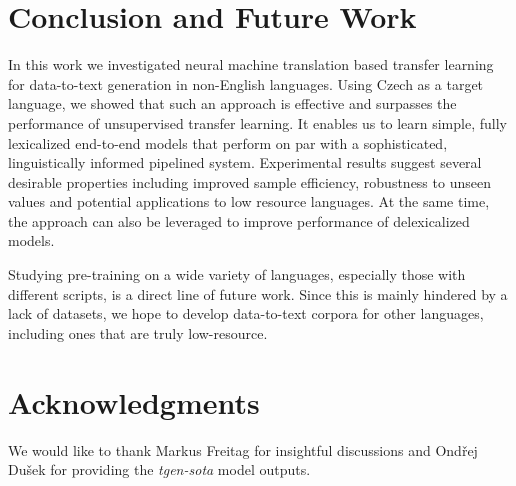 \documentclass[11pt,a4paper]{article}
\begin{document}
\section{Conclusion and Future Work}
In this work we investigated neural machine translation based transfer learning for data-to-text generation in non-English languages. Using Czech as a target language, we showed that such an approach is effective and surpasses the performance of unsupervised transfer learning. It enables us to learn simple, fully lexicalized end-to-end models that perform on par with a sophisticated, linguistically informed pipelined system. Experimental results suggest several desirable properties including improved sample efficiency,  robustness to unseen values and potential applications to low resource languages. At the same time, the approach can also be leveraged to improve performance of delexicalized models. \par
Studying pre-training on a wide variety of languages, especially those with different scripts, is a direct line of future work. Since this is mainly hindered by a lack of datasets, we hope to develop data-to-text corpora for other languages, including ones that are truly low-resource. 



\section*{Acknowledgments}
We would like to thank Markus Freitag for insightful discussions and Ondřej Dušek for providing the \textsl{tgen-sota} model outputs.





\end{document}
